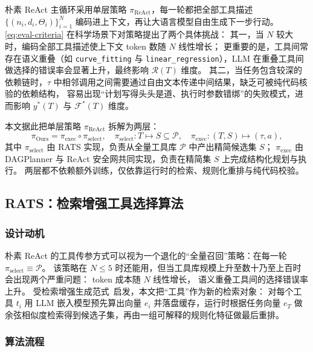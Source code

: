 朴素 ReAct 主循环\cite{yao2023react}采用单层策略 $\pi_{\text{ReAct}}$，每一轮都把全部工具描述 $\{(n_i, d_i, \Theta_i)\}_{i=1}^{N}$ 编码进上下文，再让大语言模型自由生成下一步行动。
\autoref{eq:eval-criteria} 在科学场景下对策略提出了两个具体挑战：
其一，当 $N$ 较大时，编码全部工具描述使上下文 token 数随 $N$ 线性增长；
更重要的是，工具间常存在语义重叠（如 \texttt{curve\_fitting} 与 \texttt{linear\_regression}），LLM 在重叠工具间做选择的错误率会显著上升，最终影响 $\mathcal{R}(T)$ 维度。
其二，当任务包含较深的依赖链时，$\tau$ 中相邻调用之间需要通过自由文本传递中间结果，缺乏可被纯代码核验的依赖结构，
容易出现“计划写得头头是道、执行时参数错绑”的失败模式，进而影响 $y^{*}(T)$ 与 $\mathcal{F}^{*}(T)$ 维度。

本文据此把单层策略 $\pi_{\text{ReAct}}$ 拆解为两层：
\begin{equation}
\pi_{\text{Ours}}=\pi_{\text{exec}}\circ\pi_{\text{select}},\quad
\pi_{\text{select}}:T\mapsto S\subseteq\mathcal{P},\quad
\pi_{\text{exec}}:(T,S)\mapsto(\tau, a),
\label{eq:two-layer}
\end{equation}
其中 $\pi_{\text{select}}$ 由 RATS 实现，负责从全量工具库 $\mathcal{P}$ 中产出精简候选集 $S$；
$\pi_{\text{exec}}$ 由 DAGPlanner 与 ReAct 安全网共同实现，负责在精简集 $S$ 上完成结构化规划与执行。
两层都不依赖额外训练，仅依靠运行时的检索、规则化重排与纯代码校验。

\subsection{RATS：检索增强工具选择算法}\label{sec:rats}

\subsubsection{设计动机}

朴素 ReAct 的工具传参方式可以视为一个退化的“全量召回”策略：在每一轮 $\pi_{\text{select}}\equiv\mathcal{P}$。
该策略在 $N\le 5$ 时还能用，但当工具库规模上升至数十乃至上百时会出现两个严重问题：
token 成本随 $N$ 线性增长，
语义重叠工具间的选择错误率上升。
受检索增强生成范式~\cite{lewis2020rag,karpukhin2020dpr}启发，本文把“工具”作为新的检索对象：
对每个工具 $t_i$ 用 LLM 嵌入模型预先算出向量 $e_i$ 并落盘缓存，运行时根据任务向量 $e_T$ 做余弦相似度检索得到候选子集，再由一组可解释的规则化特征做最后重排。

\subsubsection{算法流程}

